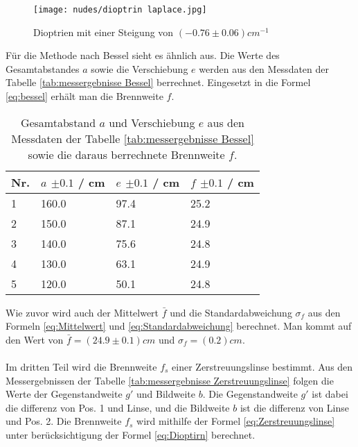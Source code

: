 \documentclass[12pt,a4paper,twoside]{article}
\begin{document}
\begin{figure}[H]
    \centering
    \texttt{[image: nudes/dioptrin laplace.jpg]}
    \caption{Dioptrien mit einer Steigung von $(-0.76 \pm 0.06) cm^{-1}$}
    \label{fig:Dioptrien laplace plot}
\end{figure}

\noindent
Für die Methode nach Bessel sieht es ähnlich aus. Die Werte des Gesamtabstandes $a$ sowie die Verschiebung $e$ werden aus den Messdaten der Tabelle \ref{tab:messergebnisse Bessel} berrechnet. Eingesetzt in die Formel \ref{eq:bessel} erhält man die Brennweite $f$. 

\begin{table}[H]
    \centering
    \caption{Gesamtabstand $a$ und Verschiebung $e$ aus den Messdaten der Tabelle \ref{tab:messergebnisse Bessel} sowie die daraus berrechnete Brennweite $f$. }
    \label{tab:berechnung Bessel}
    \begin{tabular}{| l | l | l | l |}
        \hline
        Nr.  & $a$ $\pm 0.1 $ / cm &  $e$ $\pm 0.1 $ / cm & $f$ $\pm 0.1 $ / cm  \\
        \hline
        1  & 160.0   & 97.4 &  25.2  \\
        2  & 150.0   & 87.1 &  24.9  \\
        3  & 140.0   & 75.6 &  24.8  \\
        4  & 130.0   & 63.1 &  24.9  \\
        5  & 120.0   & 50.1 &  24.8  \\
        \hline
    \end{tabular}
\end{table}

\noindent
Wie zuvor wird auch der Mittelwert $\bar{f}$ und die Standardabweichung $\sigma_f$ aus den Formeln \ref{eq:Mittelwert} und \ref{eq:Standardabweichung} berechnet. 
Man kommt auf den Wert von $\bar{f} = (24.9 \pm 0.1) cm$ und $\sigma_f =( 0.2) cm$. 
\\
\\
Im dritten Teil wird die Brennweite $f_s$ einer Zerstreuungslinse bestimmt. Aus den Messergebnissen der Tabelle \ref{tab:messergebnisse Zerstreuungslinse} folgen die Werte der Gegenstandweite $g'$ und Bildweite $b$. 
Die Gegenstandweite $g'$ ist dabei die differenz von Pos. 1 und Linse, und die Bildweite $b$ ist die differenz von Linse und Pos. 2. 
Die Brennweite $f_s$ wird mithilfe der Formel \ref{eq:Zerstreuungslinse} unter berücksichtigung der Formel \ref{eq:Dioptirn} berechnet. 
\end{document}

